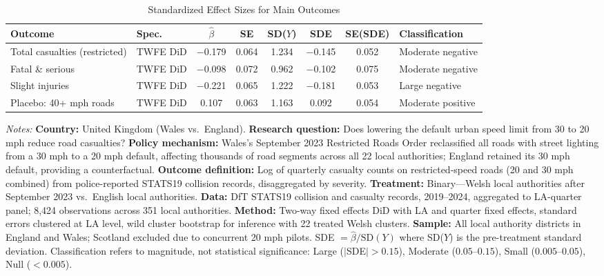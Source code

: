 \begin{table}[H]
\centering
\caption{Standardized Effect Sizes for Main Outcomes}
\label{tab:sde}
\begin{adjustbox}{max width=\textwidth}
\begin{tabular}{llcccccl}
\toprule
Outcome & Spec. & $\hat{\beta}$ & SE & SD($Y$) & SDE & SE(SDE) & Classification \\
\midrule
Total casualties (restricted) & TWFE DiD & $-$0.179 & 0.064 & 1.234 & $-$0.145 & 0.052 & Moderate negative \\
Fatal \& serious & TWFE DiD & $-$0.098 & 0.072 & 0.962 & $-$0.102 & 0.075 & Moderate negative \\
Slight injuries & TWFE DiD & $-$0.221 & 0.065 & 1.222 & $-$0.181 & 0.053 & Large negative \\
Placebo: 40+ mph roads & TWFE DiD & 0.107 & 0.063 & 1.163 & 0.092 & 0.054 & Moderate positive \\
\bottomrule
\end{tabular}
\end{adjustbox}
\par\vspace{0.5em}
{\footnotesize\noindent \textit{Notes:}
\textbf{Country:} United Kingdom (Wales vs.\ England).
\textbf{Research question:} Does lowering the default urban speed limit from 30 to 20 mph reduce road casualties?
\textbf{Policy mechanism:} Wales's September 2023 Restricted Roads Order reclassified all roads with street lighting from a 30 mph to a 20 mph default, affecting thousands of road segments across all 22 local authorities; England retained its 30 mph default, providing a counterfactual.
\textbf{Outcome definition:} Log of quarterly casualty counts on restricted-speed roads (20 and 30 mph combined) from police-reported STATS19 collision records, disaggregated by severity.
\textbf{Treatment:} Binary---Welsh local authorities after September 2023 vs.\ English local authorities.
\textbf{Data:} DfT STATS19 collision and casualty records, 2019--2024, aggregated to LA-quarter panel; 8,424 observations across 351 local authorities.
\textbf{Method:} Two-way fixed effects DiD with LA and quarter fixed effects, standard errors clustered at LA level, wild cluster bootstrap for inference with 22 treated Welsh clusters.
\textbf{Sample:} All local authority districts in England and Wales; Scotland excluded due to concurrent 20 mph pilots.
SDE $= \hat{\beta} / \text{SD}(Y)$ where SD($Y$) is the pre-treatment standard deviation. Classification refers to magnitude, not statistical significance: Large ($|$SDE$| > 0.15$), Moderate ($0.05$--$0.15$), Small ($0.005$--$0.05$), Null ($< 0.005$).}
\end{table}
